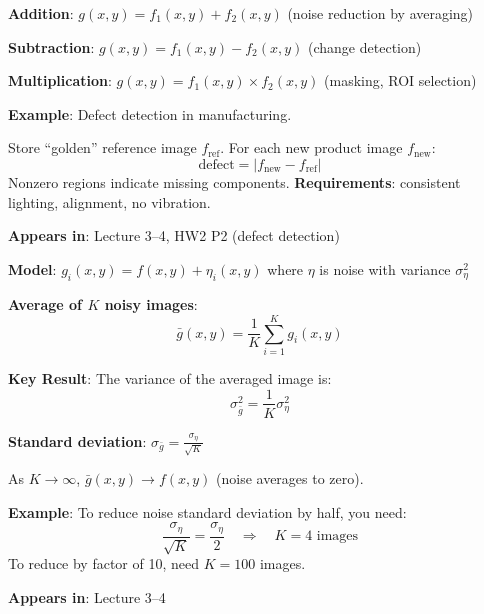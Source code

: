 \documentclass[10pt]{article}
\begin{document}

\begin{conceptbox}

\begin{formulabox}
\textbf{Addition}: $g(x,y) = f_1(x,y) + f_2(x,y)$ \hfill (noise reduction by averaging)

\textbf{Subtraction}: $g(x,y) = f_1(x,y) - f_2(x,y)$ \hfill (change detection)

\textbf{Multiplication}: $g(x,y) = f_1(x,y) \times f_2(x,y)$ \hfill (masking, ROI selection)
\end{formulabox}

\begin{examplebox}
\textbf{Example}: Defect detection in manufacturing.

Store ``golden'' reference image $f_{\text{ref}}$. For each new product image $f_{\text{new}}$:
\[
\text{defect} = |f_{\text{new}} - f_{\text{ref}}|
\]
Nonzero regions indicate missing components. \textbf{Requirements}: consistent lighting, alignment, no vibration.
\end{examplebox}

\textbf{Appears in}: Lecture 3--4, HW2 P2 (defect detection)

\end{conceptbox}


\begin{conceptbox}

\begin{formulabox}
\textbf{Model}: $g_i(x,y) = f(x,y) + \eta_i(x,y)$ where $\eta$ is noise with variance $\sigma_\eta^2$

\textbf{Average of $K$ noisy images}:
\[
\bar{g}(x,y) = \frac{1}{K}\sum_{i=1}^{K} g_i(x,y)
\]

\textbf{Key Result}: The variance of the averaged image is:
\[
\boxed{\sigma_{\bar{g}}^2 = \frac{1}{K}\sigma_\eta^2}
\]

\textbf{Standard deviation}: $\sigma_{\bar{g}} = \frac{\sigma_\eta}{\sqrt{K}}$

As $K \to \infty$, $\bar{g}(x,y) \to f(x,y)$ (noise averages to zero).
\end{formulabox}

\begin{examplebox}
\textbf{Example}: To reduce noise standard deviation by half, you need:
\[
\frac{\sigma_\eta}{\sqrt{K}} = \frac{\sigma_\eta}{2} \quad \Rightarrow \quad K = 4 \text{ images}
\]
To reduce by factor of 10, need $K = 100$ images.
\end{examplebox}

\textbf{Appears in}: Lecture 3--4

\end{conceptbox}
\end{document}
